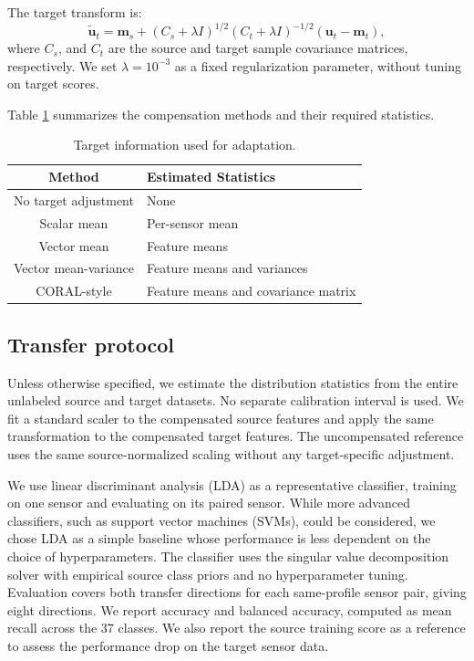 \documentclass[conference]{IEEEtran}
\begin{document}
The target transform is:
\begin{equation}
\tilde{\mathbf{u}}_t=\mathbf{m}_s+(C_s+\lambda I)^{1/2}(C_t+\lambda I)^{-1/2}(\mathbf{u}_t-\mathbf{m}_t),
\end{equation}
where $C_s$, and $C_t$ are the source and target sample covariance matrices, respectively. We set $\lambda=10^{-3}$ as a fixed regularization parameter, without tuning on target scores.

Table \ref{tab:target-information} summarizes the compensation methods and their required statistics.
\begin{table}[htb]
\centering
\caption{Target information used for adaptation.}
\label{tab:target-information}
\begin{tabular}{|c|l|}
\hline
\textbf{Method} & \textbf{Estimated Statistics} \\
\hline
No target adjustment & None\\
\hline
Scalar mean & Per-sensor mean \\
\hline
Vector mean & Feature means \\
\hline
Vector mean-variance & Feature means and variances \\
\hline
CORAL-style & Feature means and covariance matrix \\
\hline
\end{tabular}
\end{table}


\subsection{Transfer protocol}
Unless otherwise specified, we estimate the distribution statistics from the entire unlabeled source and target datasets. No separate calibration interval is used. We fit a standard scaler to the compensated source features and apply the same transformation to the compensated target features. The uncompensated reference uses the same source-normalized scaling without any target-specific adjustment.

We use linear discriminant analysis (LDA) as a representative classifier, training on one sensor and evaluating on its paired sensor. While more advanced classifiers, such as support vector machines (SVMs), could be considered, we chose LDA as a simple baseline whose performance is less dependent on the choice of hyperparameters. The classifier uses the singular value decomposition solver with empirical source class priors and no hyperparameter tuning. Evaluation covers both transfer directions for each same-profile sensor pair, giving eight directions.
We report accuracy and balanced accuracy, computed as mean recall across the 37 classes. We also report the source training score as a reference to assess the performance drop on the target sensor data.
\end{document}
